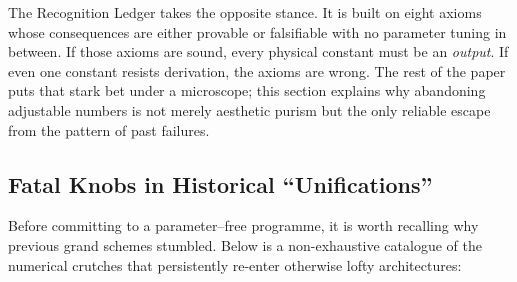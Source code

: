 \documentclass[11pt]{article}
\begin{document}
The Recognition Ledger takes the opposite stance.  It is built on eight axioms whose consequences are either provable or falsifiable with no parameter tuning in between.  If those axioms are sound, every physical constant must be an \emph{output}.  If even one constant resists derivation, the axioms are wrong.  The rest of the paper puts that stark bet under a microscope; this section explains why abandoning adjustable numbers is not merely aesthetic purism but the only reliable escape from the pattern of past failures.

\subsection{Fatal Knobs in Historical ``Unifications''}
\label{subsec:fatal-knobs}

Before committing to a parameter–free programme, it is worth recalling why previous grand schemes stumbled.  Below is a non-exhaustive catalogue of the numerical crutches that persistently re-enter otherwise lofty architectures:
\end{document}

